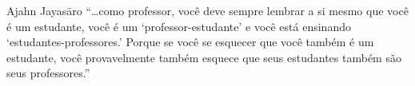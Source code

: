 
\begin{quotepage}{0.6\linewidth}{Ajahn Jayasāro}
“…como professor, você deve sempre lembrar a si mesmo que você é um
estudante, você é um ‘professor-estudante’ e você está ensinando
‘estudantes-professores.’ Porque se você se esquecer que você também é
um estudante, você provavelmente também esquece que seus estudantes
também são seus professores.”
\end{quotepage}

